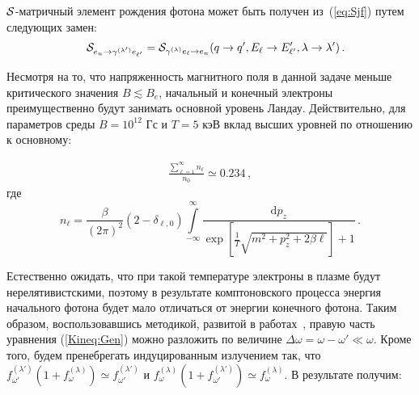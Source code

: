 \documentclass[14pt, russian]{article}
\def\beq{\begin{eqnarray}}
\def\eeq{\end{eqnarray}}
\newcommand{\dd}{\mathrm{d}} %
\begin{document}
${\cal S}$-матричный элемент рождения фотона может быть получен 
из~(\ref{eq:Sjf}) путем следующих замен:
%
\beq
&&{\cal S}_{e_n \to \gamma^{(\lambda')} e_{\ell'}}=
{\cal S}_{\gamma^{(\lambda)} e_\ell \to e_n}(q\to q', E_\ell \to E'_{\ell'}, \lambda \to \lambda') \, .
\eeq

Несмотря на то, что напряженность магнитного поля в данной задаче меньше критического значения $B\lesssim B_e$, начальный и конечный электроны преимущественно будут занимать основной уровень Ландау. Действительно, для параметров среды $B=10^{12}$ Гс и $T=5$ кэВ вклад высших уровней  по отношению к основному:

\begin{equation}
\begin{gathered}
\frac{\sum_{\ell=1}^{\infty}n_\ell}{n_0}\simeq 0.234 \, ,
\end{gathered}
\end{equation}
где
\begin{equation}
	n_\ell=\frac{\beta}{(2 \pi)^2} (2-\delta_{\ell,0}) \int \limits^{\infty}_{-\infty} \frac{\dd p_z}{\exp\left[\frac{1}{T}\sqrt{m^2+p_z^2+2\beta\ell}\right]+1}\, .
\end{equation}

Естественно ожидать, что при такой температуре электроны в плазме будут нерелятивистскими, поэтому в результате комптоновского процесса энергия начального фотона будет мало отличаться от энергии конечного фотона.
Таким образом, воспользовавшись методикой, развитой в работах~\cite{Kompaneets:1957,Lubarsky:1988}, правую часть уравнения (\ref{Kineq:Gen}) можно разложить по величине $\Delta\omega=\omega-\omega'\ll\omega$. Кроме того, будем пренебрегать индуцированным излучением так, что  $f_{\omega'}^{(\lambda')}(1+f_\omega^{(\lambda)})\simeq f_{\omega '}^{(\lambda')}$ и $f_\omega^{(\lambda)}(1+f^{(\lambda')}_{\omega'})\simeq f_\omega^{(\lambda)}$. В результате получим:
 
\end{document}
